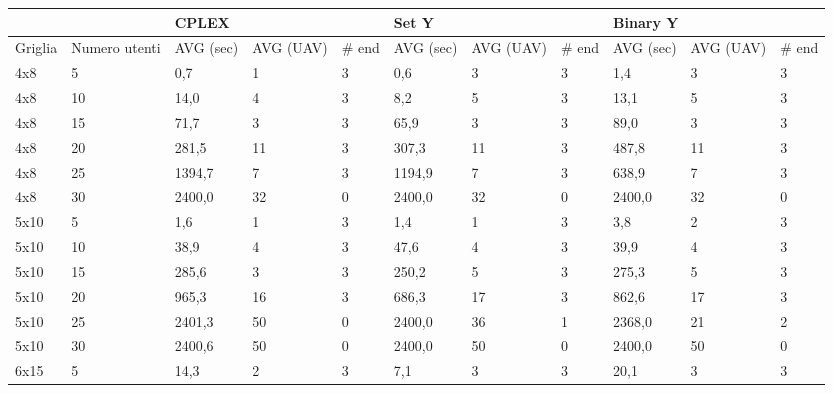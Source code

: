 \begin{table}[]
	\centering
	\scriptsize
	\begin{tabular}{@{}lllllllllll@{}}
		\toprule
		&               & \multicolumn{3}{l}{CPLEX}      & \multicolumn{3}{l}{Set Y}      & \multicolumn{3}{l}{Binary Y}   \\ \midrule
		Griglia & Numero utenti & AVG (sec) & AVG (UAV) & \# end & AVG (sec) & AVG (UAV) & \# end & AVG (sec) & AVG (UAV) & \# end \\
		4x8     & 5             & 0,7       & 1         & 3      & 0,6       & 3         & 3      & 1,4       & 3         & 3      \\
		4x8     & 10            & 14,0      & 4         & 3      & 8,2       & 5         & 3      & 13,1      & 5         & 3      \\
		4x8     & 15            & 71,7      & 3         & 3      & 65,9      & 3         & 3      & 89,0      & 3         & 3      \\
		4x8     & 20            & 281,5     & 11        & 3      & 307,3     & 11        & 3      & 487,8     & 11        & 3      \\
		4x8     & 25            & 1394,7    & 7         & 3      & 1194,9    & 7         & 3      & 638,9     & 7         & 3      \\
		4x8     & 30            & 2400,0    & 32        & 0      & 2400,0    & 32        & 0      & 2400,0    & 32        & 0      \\
		5x10    & 5             & 1,6       & 1         & 3      & 1,4       & 1         & 3      & 3,8       & 2         & 3      \\
		5x10    & 10            & 38,9      & 4         & 3      & 47,6      & 4         & 3      & 39,9      & 4         & 3      \\
		5x10    & 15            & 285,6     & 3         & 3      & 250,2     & 5         & 3      & 275,3     & 5         & 3      \\
		5x10    & 20            & 965,3     & 16        & 3      & 686,3     & 17        & 3      & 862,6     & 17        & 3      \\
		5x10    & 25            & 2401,3    & 50        & 0      & 2400,0    & 36        & 1      & 2368,0    & 21        & 2      \\
		5x10    & 30            & 2400,6    & 50        & 0      & 2400,0    & 50        & 0      & 2400,0    & 50        & 0      \\
		6x15    & 5             & 14,3      & 2         & 3      & 7,1       & 3         & 3      & 20,1      & 3         & 3      \\

\end{tabular}
\end{table}
